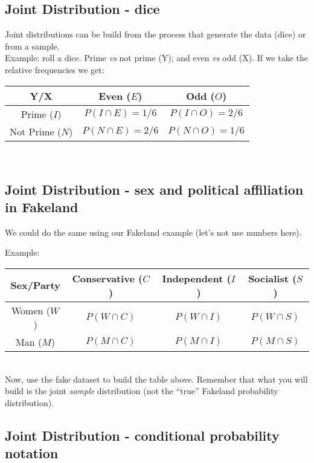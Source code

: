 \documentclass[11pt]{article}
\begin{document}
	\subsection*{Joint Distribution - dice}
	Joint distributions can be build from the process that generate the data (dice) or from a sample.
	\newline\\
	Example: roll a dice. Prime \emph{vs} not prime (Y); and even \emph{vs} odd (X). If we take the relative frequencies we get:\newline\\
	\begin{tabular}{|c|cc|}
\hline
	Y/X & Even ($E$) & Odd ($O$)\\
\hline
	Prime ($I$) & $P(I \cap E) = 1/6$ & $P(I \cap O) = 2/6$\\
	Not Prime ($N$) & $P(N \cap E) = 2/6$ & $P(N \cap O)= 1/6$ \\
\hline
\end{tabular}\newline\\


	\subsection*{Joint Distribution - sex and political affiliation in Fakeland}

	We could do the same using our Fakeland example (let's not use numbers here).

	Example:\newline\\
	\begin{tabular}{|c|ccc|}
\hline
	Sex/Party & Conservative ($C$) & Independent ($I$) & Socialist ($S$)\\
\hline
	Women ($W$) & $P(W \cap C)$ & $P(W \cap I)$ & $P(W \cap S)$\\
	Man ($M$) & $P(M \cap C)$ & $P(M \cap I)$ & $P(M \cap S)$ \\
\hline

\end{tabular}\newline\\

Now, use the fake dataset to build the table above. Remember that what you will build is the joint \emph{sample} distribution (not the ``true'' Fakeland probability distribution).

	\subsection*{Joint Distribution - conditional probability notation}
	
\end{document}
